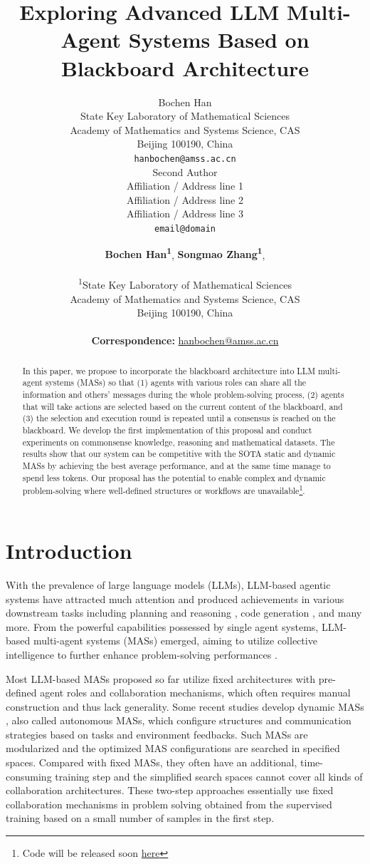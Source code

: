 \documentclass[11pt]{article}
\title{Exploring Advanced LLM Multi-Agent Systems Based on Blackboard Architecture}
\author{Bochen Han \\
  State Key Laboratory of Mathematical Sciences \\
  Academy of Mathematics and Systems Science, CAS \\
  Beijing 100190, China \\
  \texttt{hanbochen@amss.ac.cn} \\\And
  Second Author \\
  Affiliation / Address line 1 \\
  Affiliation / Address line 2 \\
  Affiliation / Address line 3 \\
  \texttt{email@domain} \\}
\author{
 \textbf{Bochen Han\textsuperscript{1}},
  \textbf{Songmao Zhang\textsuperscript{1}},
\\
\\
 \textsuperscript{1}State Key Laboratory of Mathematical Sciences \\
  Academy of Mathematics and Systems Science, CAS \\
  Beijing 100190, China \\
\\
 \small{
   \textbf{Correspondence:} \href{mailto:email@domain}{hanbochen@amss.ac.cn}
 }
}
\begin{document}
\maketitle
\begin{abstract}
In this paper, we propose to incorporate the blackboard architecture into LLM multi-agent systems (MASs) so that (1) agents with various roles can share all the information and others' messages during the whole problem-solving process, (2) agents that will take actions are selected based on the current content of the blackboard, and (3) the selection and execution round is repeated until a consensus is reached on the blackboard. We develop the first implementation of this proposal and conduct experiments on commonsense knowledge, reasoning and mathematical datasets. The results show that our system can be competitive with the SOTA static and dynamic MASs by achieving the best average performance, and at the same time manage to spend less tokens. Our proposal has the potential to enable complex and dynamic problem-solving where well-defined structures or workflows are unavailable\footnote{Code will be released soon \href{https://github.com/bc200/LbMAS/}{here}}.
\end{abstract}

\section{Introduction}

With the prevalence of large language models (LLMs), LLM-based agentic systems have attracted much attention and produced achievements in various downstream tasks including planning and reasoning \citep{putta2024agent,hao2023reasoning,sun2024thinkongraph}, code generation \citep{tang-etal-2024-codeagent,yang2024swe}, and many more. From the powerful capabilities possessed by single agent systems, LLM-based multi-agent systems (MASs) emerged, aiming to utilize collective intelligence to further enhance problem-solving performances \citep{chan2308chateval,li2023camel,li-etal-2023-theoryofmind, yin2023exchangeofthought}. 

Most LLM-based MASs proposed so far utilize fixed architectures with pre-defined agent roles and collaboration mechanisms, which often requires manual construction and thus lack generality. Some recent studies develop dynamic MASs \citep{hu2025automated,zhang2025aflow,shang2025agentsquare,liu2024dynamic,zhang2025multi}, also called autonomous MASs, which configure structures and communication strategies based on tasks and environment feedbacks. Such MASs are modularized and the optimized MAS configurations are searched in specified spaces. Compared with fixed MASs, they often have an additional, time-consuming training step and the simplified search spaces cannot cover all kinds of collaboration architectures. These two-step approaches essentially use fixed collaboration mechanisms in problem solving obtained from the supervised training based on a small number of samples in the first step.
\end{document}
